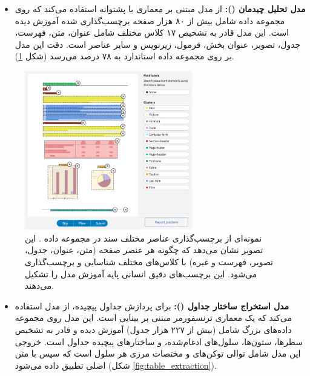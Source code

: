 \begin{itemize}
    \item \textbf{مدل تحلیل چیدمان ():}  از مدل  مبتنی بر معماری  با پشتوانه  استفاده می‌کند که روی مجموعه داده  شامل بیش از ۸۰ هزار صفحه برچسب‌گذاری شده آموزش دیده است. این مدل قادر به تشخیص ۱۷ کلاس مختلف شامل عنوان، متن، فهرست، جدول، تصویر، عنوان بخش، فرمول، زیرنویس و سایر عناصر است. دقت این مدل بر روی مجموعه داده استاندارد  به ۷۸ درصد  می‌رسد (شکل \ref{fig:doclaynet_labels}).
\end{itemize}

\begin{figure}[!htbp]
    \centering
    \includegraphics[width=0.65\textwidth]{doclaynet.png}
    \caption{نمونه‌ای از برچسب‌گذاری عناصر مختلف سند در مجموعه داده . این تصویر نشان می‌دهد که چگونه هر عنصر صفحه (متن، عنوان، جدول، تصویر، فهرست و غیره) با کلاس‌های مختلف شناسایی و برچسب‌گذاری می‌شود. این برچسب‌های دقیق انسانی پایه آموزش مدل  را تشکیل می‌دهند.}
    \label{fig:doclaynet_labels}
\end{figure}

\begin{itemize}
    \item \textbf{مدل استخراج ساختار جداول ():} برای پردازش جداول پیچیده،  از مدل  استفاده می‌کند که یک معماری ترنسفورمر مبتنی بر بینایی است. این مدل روی مجموعه داده‌های بزرگ شامل  (بیش از ۲۲۷ هزار جدول) آموزش دیده و قادر به تشخیص سطرها، ستون‌ها، سلول‌های ادغام‌شده، و ساختارهای پیچیده جداول است. خروجی این مدل شامل توالی توکن‌های  و مختصات مرزی هر سلول است که سپس با متن اصلی  تطبیق داده می‌شود (شکل \ref{fig:table_extraction}).
\end{itemize}

